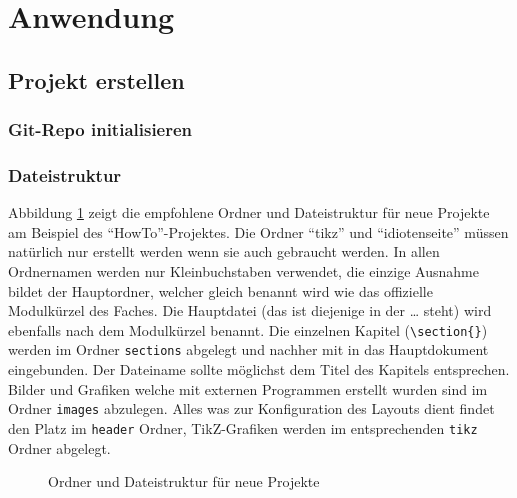 \section{Anwendung}
\subsection{Projekt erstellen}
\subsubsection{Git-Repo initialisieren}

\subsubsection{Dateistruktur}
Abbildung \ref{fig:OrdnerDatei} zeigt die empfohlene Ordner und Dateistruktur für neue Projekte am Beispiel des "`HowTo"'-Projektes.
Die Ordner "`tikz"' und "`idiotenseite"' müssen natürlich nur erstellt werden wenn sie auch gebraucht werden. In allen Ordnernamen werden nur
Kleinbuchstaben verwendet, die einzige Ausnahme bildet der Hauptordner, welcher gleich benannt wird wie das offizielle Modulkürzel des Faches.
Die Hauptdatei (das ist diejenige in der \verb++ \ldots \verb++ steht) wird ebenfalls nach dem Modulkürzel benannt.
Die einzelnen Kapitel (\verb+\section{}+) werden im Ordner \verb+sections+ abgelegt und nachher mit \verb++ in das Hauptdokument eingebunden.
Der Dateiname sollte möglichst dem Titel des Kapitels entsprechen. Bilder und Grafiken welche mit externen Programmen erstellt wurden sind im Ordner
\verb+images+ abzulegen. Alles was zur Konfiguration des Layouts dient findet den Platz im \verb+header+ Ordner, TikZ-Grafiken werden im entsprechenden
\verb+tikz+ Ordner abgelegt.

\begin{figure}[h]
\centering
  \caption[Ordner und Dateistruktur]{Ordner und Dateistruktur für neue Projekte}
  \label{fig:OrdnerDatei}
\end{figure}

